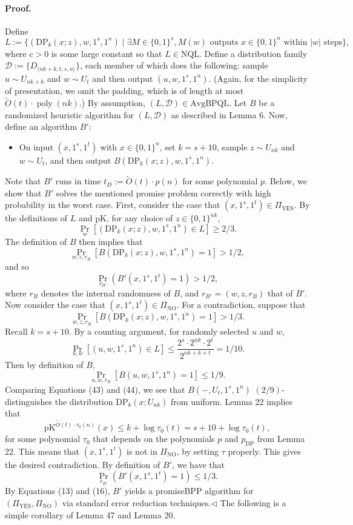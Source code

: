 \documentclass[10pt,a4paper]{article}
\begin{document}
\paragraph{Proof.} Define
\[L:=\{(\mathrm{DP}_k(x;z),w,1^s,1^n)\mid\exists M\in\{0,1\}^s,M(w)\text{ outputs }x\in\{0,1\}^n\text{ within }|w|\text{ steps}\},\]
where $c>0$ is some large constant so that $L\in\mathrm{NQL}$. Define a distribution family $\mathcal D:=\{D_{\langle nk+k,t,s,n\rangle}\}$, each member of which does the following: sample $u\sim U_{nk+k}$ and $w\sim U_t$ and then output $(u,w,1^s,1^n)$. (Again, for the simplicity of presentation, we omit the padding, which is of length at most $\widetilde O(t)\cdot\operatorname{poly}(nk)$.) By assumption, $(L,\mathcal D)\in\mathrm{AvgBPQL}$. Let $B$ be a randomized heuristic algorithm for $(L,\mathcal D)$ as described in Lemma 6. Now, define an algorithm $B'$:
\begin{itemize}
\item On input $(x,1^s,1^t)$ with $x\in\{0,1\}^n$, set $k=s+10$, sample $z\sim U_{nk}$ and $w\sim U_t$, and then output $B(\mathrm{DP}_k(x;z),w,1^s,1^n)$.
\end{itemize}
Note that $B'$ runs in time $t_D:=\widetilde O(t)\cdot p(n)$ for some polynomial $p$. Below, we show that $B'$ solves the mentioned promise problem correctly with high probability in the worst case.
First, consider the case that $(x,1^s,1^t)\in\Pi_{\mathrm{YES}}$. By the definitions of $L$ and pK, for any choice of $z\in\{0,1\}^{nk}$,
\[\Pr_w[(\mathrm{DP}_k(x;z),w,1^s,1^n)\in L]\geq2/3.\]
The definition of $B$ then implies that
\[\Pr_{w,z,r_B}[B(\mathrm{DP}_k(x;z),w,1^s,1^n)=1]>1/2,\]
and so
\[\Pr_{r_{B'}}(B'(x,1^s,1^t)=1)>1/2,\tag{42}\]
where $r_B$ denotes the internal randomness of $B$, and $r_{B'}=(w,z,r_B)$ that of $B'$.
Now consider the case that $(x,1^s,1^t)\in\Pi_{\mathrm{NO}}$. For a contradiction, suppose that
\[\Pr_{w,z,r_B}[B(\mathrm{DP}_k(x;z),w,1^s,1^n)=1]>1/3.\tag{43}\]
Recall $k=s+10$. By a counting argument, for randomly selected $u$ and $w$,
\[\Pr_{u,w}[(u,w,1^s,1^n)\in L]\leq\frac{2^s\cdot2^{nk}\cdot2^t}{2^{nk+k+t}}=1/10.\]
Then by definition of $B$,
\[\Pr_{u,w,r_B}[B(u,w,1^s,1^n)=1]\leq1/9.\tag{44}\]
Comparing Equations (43) and (44), we see that $B(-,U_t,1^s,1^n)$ $(2/9)$-distinguishes the distribution $\mathrm{DP}_k(x;U_{nk})$ from uniform. Lemma 22 implies that
\[\mathrm{pK}^{\widetilde O(t)\cdot\tau_0(n)}(x)\leq k+\log\tau_0(t)=s+10+\log\tau_0(t),\]
for some polynomial $\tau_0$ that depends on the polynomials $p$ and $p_{\mathrm{DP}}$ from Lemma 22. This means that $(x,1^s,1^t)$ is not in $\Pi_{\mathrm{NO}}$, by setting $\tau$ properly. This gives the desired contradiction. By definition of $B'$, we have that
\[\Pr_{r_{B'}}(B'(x,1^s,1^t)=1)\leq1/3.\tag{45}\]
By Equations (13) and (16), $B'$ yields a promiseBPP algorithm for $(\Pi_{\mathrm{YES}},\Pi_{\mathrm{NO}})$ via standard error reduction techniques.\hfill$\triangleleft$
The following is a simple corollary of Lemma 47 and Lemma 20.
\end{document}
